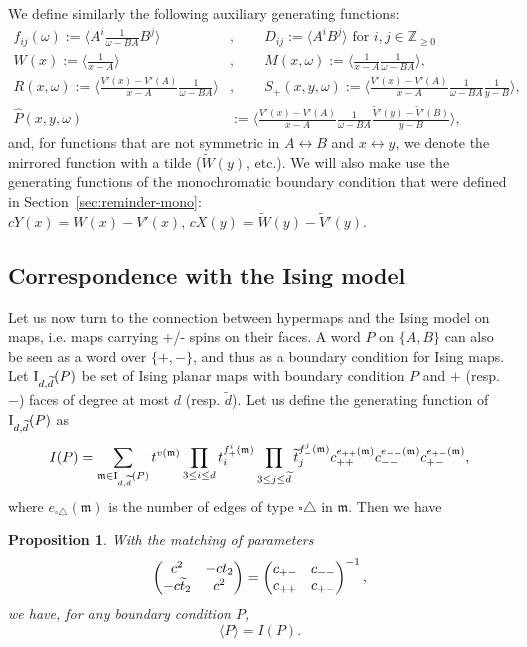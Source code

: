 \documentclass{scrartcl}
\newcommand\brak[1]{\big \langle #1 \big\rangle}
\newcommand{\Z}{\mathbb{Z}}
\newcommand\wt[1]{\widetilde{#1}}
\newtheorem{prop}[thm]{Proposition}
\begin{document}
We define similarly the following auxiliary generating functions:
\begin{align}
f_{ij}(\omega):=\brak{A^i\frac{1}{\omega - BA}B^j}&, \qquad D_{ij}:=\brak{A^iB^j} \text{ for } i,j \in \Z_{\geq 0} \nonumber\\
W(x):=\brak{\frac{1}{x-A}}&, \qquad M(x,\omega):=\brak{\frac{1}{x-A}\frac{1}{\omega - BA}}, \nonumber\\
R(x,\omega):=\brak{\frac{V'(x) - V'(A)}{x-A}\frac{1}{\omega - BA}}&, \qquad S_+(x,y,\omega):=\brak{\frac{V'(x) - V'(A)}{x-A}\frac{1}{\omega - BA}\frac{1}{y-B}}, \nonumber\\
\widehat{P}(x,y,\omega)&:=\brak{\frac{V'(x) - V'(A)}{x-A}\frac{1}{\omega - BA}\frac{\widetilde{V}'(y)-\widetilde{V}'(B)}{y-B}},
\label{eq: auxiliary fcts def}
\end{align}
and, for functions that are not symmetric in $A \leftrightarrow B$ and $x \leftrightarrow y$, we denote the mirrored function with a tilde ($\widetilde{W}(y)$, etc.). We will also make use the generating functions of the monochromatic boundary condition that were defined in Section~\ref{sec:reminder-mono}: $cY(x)=W(x)-V'(x), \, cX(y)=\widetilde{W}(y)-\widetilde{V}'(y)$.

\subsection{Correspondence with the Ising model}
\label{sec:corresp-ising}

Let us now turn to the connection between hypermaps and the Ising model on maps, i.e. maps carrying +/- spins on their faces. A word $P$ on $\{A,B\}$ can also be seen as a word over $\{+,-\}$, and thus as a boundary condition for Ising maps. Let $\textnormal{I}_{d,\wt d}(P)$ be set of Ising planar maps with boundary condition $P$ and $+$ (resp. $-$) faces of degree at most $d$ (resp. $\wt d$). Let us define the generating function of $\textnormal{I}_{d,\wt d}(P)$ as
\[
I(P)=\sum_{\mathfrak{m}\in\textnormal{I}_{d,\wt d}(P)}t^{v(\mathfrak{m})}\prod_{3\leq i\leq d}t_i^{f_{+}^i(\mathfrak{m})}\prod_{3\leq j\leq \widetilde{d}}\widetilde{t}_j^{f_{-}^j(\mathfrak{m})}c_{++}^{e_{++}(\mathfrak{m})}c_{--}^{e_{--}(\mathfrak{m})}c_{+-}^{e_{+-}(\mathfrak{m})},
\]
where $e_{\square\triangle}(\mathfrak{m})$ is the number of edges of type $\square\triangle$ in $\mathfrak{m}$. Then we have

\begin{prop}
With the matching of parameters
\[ 
\begin{pmatrix}
  c^2 & -ct_2 \cr
  -c\wt{t}_2 & c^2  \cr
 \end{pmatrix}
=
 \begin{pmatrix}
  c_{+-} & c_{--} \cr
  c_{++} & c_{+-}  \cr
 \end{pmatrix}^{-1},
\]
we have, for any boundary condition $P$,
\[
\brak{P}=I(P).
\]
\end{prop}
\end{document}
